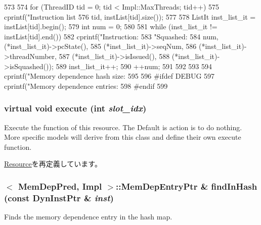 \begin{DoxyCode}
573 {
574     for (ThreadID tid = 0; tid < Impl::MaxThreads; tid++) {
575         cprintf("Instruction list %
576                 tid, instList[tid].size());
577 
578         ListIt inst_list_it = instList[tid].begin();
579         int num = 0;
580 
581         while (inst_list_it != instList[tid].end()) {
582             cprintf("Instruction:%
583                     "Squashed:%
584                     num, (*inst_list_it)->pcState(),
585                     (*inst_list_it)->seqNum,
586                     (*inst_list_it)->threadNumber,
587                     (*inst_list_it)->isIssued(),
588                     (*inst_list_it)->isSquashed());
589             inst_list_it++;
590             ++num;
591         }
592     }
593 
594     cprintf("Memory dependence hash size: %
595 
596 #ifdef DEBUG
597     cprintf("Memory dependence entries: %
598 #endif
599 }
\end{DoxyCode}
\hypertarget{classMemDepUnit_a74d7cd749b79186057ad86f5f7b79fd2}{
\subsubsection[{execute}]{\setlength{\rightskip}{0pt plus 5cm}virtual void execute (int {\em slot\_\-idx})}}
\label{classMemDepUnit_a74d7cd749b79186057ad86f5f7b79fd2}
Execute the function of this resource. The Default is action is to do nothing. More specific models will derive from this class and define their own execute function. 

\hyperlink{classResource_a39af49c5568d1db3f53c12d7d6914c32}{Resource}を再定義しています。\hypertarget{classMemDepUnit_a7c1fadef5550f6fd9382259565101bec}{
\subsubsection[{findInHash}]{$<$ MemDepPred, Impl $>$::{\bf MemDepEntryPtr} \& findInHash (const {\bf DynInstPtr} \& {\em inst})}}
\label{classMemDepUnit_a7c1fadef5550f6fd9382259565101bec}
Finds the memory dependence entry in the hash map. 


